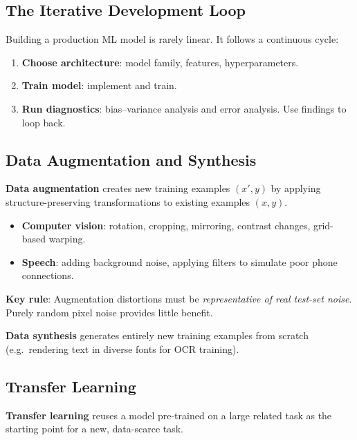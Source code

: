 \subsection{The Iterative Development Loop}

Building a production ML model is rarely linear. It follows a continuous cycle:
\begin{enumerate}
\item \textbf{Choose architecture}: model family, features, hyperparameters.
\item \textbf{Train model}: implement and train.
\item \textbf{Run diagnostics}: bias--variance analysis and error analysis.
  Use findings to loop back.
\end{enumerate}

\subsection{Data Augmentation and Synthesis}

\begin{definition}
\textbf{Data augmentation} creates new training examples $(x',y)$ by applying
structure-preserving transformations to existing examples $(x,y)$.
\end{definition}

\begin{itemize}
\item \textbf{Computer vision}: rotation, cropping, mirroring, contrast
  changes, grid-based warping.
\item \textbf{Speech}: adding background noise, applying filters to simulate
  poor phone connections.
\end{itemize}

\textbf{Key rule}: Augmentation distortions must be \emph{representative of
real test-set noise}. Purely random pixel noise provides little benefit.

\begin{definition}
\textbf{Data synthesis} generates entirely new training examples from scratch
(e.g.\ rendering text in diverse fonts for OCR training).
\end{definition}

\subsection{Transfer Learning}

\begin{definition}
\textbf{Transfer learning} reuses a model pre-trained on a large related task
as the starting point for a new, data-scarce task.
\end{definition}

